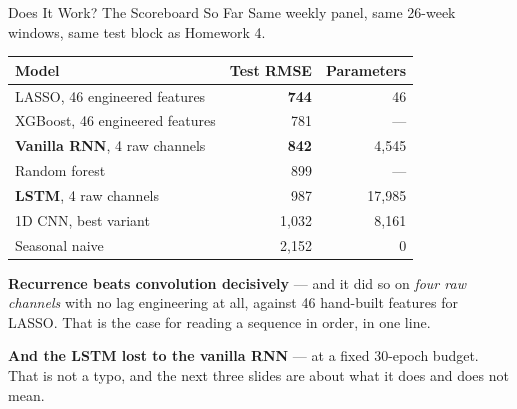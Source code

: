 \documentclass[aspectratio=169, 11pt]{beamer}
\begin{document}
\begin{frame}{Does It Work? The Scoreboard So Far}
  Same weekly panel, same 26-week windows, same test block as Homework 4.
  \begin{center}
    {\small
    \begin{tabular}{lrr}
      \toprule
      \textbf{Model} & \textbf{Test RMSE} & \textbf{Parameters} \\
      \midrule
      LASSO, 46 engineered features & \textbf{744} & 46 \\
      XGBoost, 46 engineered features & 781 & --- \\
      \textbf{Vanilla RNN}, 4 raw channels & \textbf{842} & 4{,}545 \\
      Random forest & 899 & --- \\
      \textbf{LSTM}, 4 raw channels & 987 & 17{,}985 \\
      1D CNN, best variant & 1{,}032 & 8{,}161 \\
      Seasonal naive & 2{,}152 & 0 \\
      \bottomrule
    \end{tabular}
    }
  \end{center}

  \vspace{-0.05cm}
  \textbf{Recurrence beats convolution decisively} --- and it did so on \emph{four raw channels}
  with no lag engineering at all, against 46 hand-built features for LASSO. That is the case for
  reading a sequence in order, in one line.

  \vspace{0.1cm}
  \textbf{And the LSTM lost to the vanilla RNN} --- at a fixed 30-epoch budget. That is not a
  typo, and the next three slides are about what it does and does not mean.
\end{frame}
\end{document}
